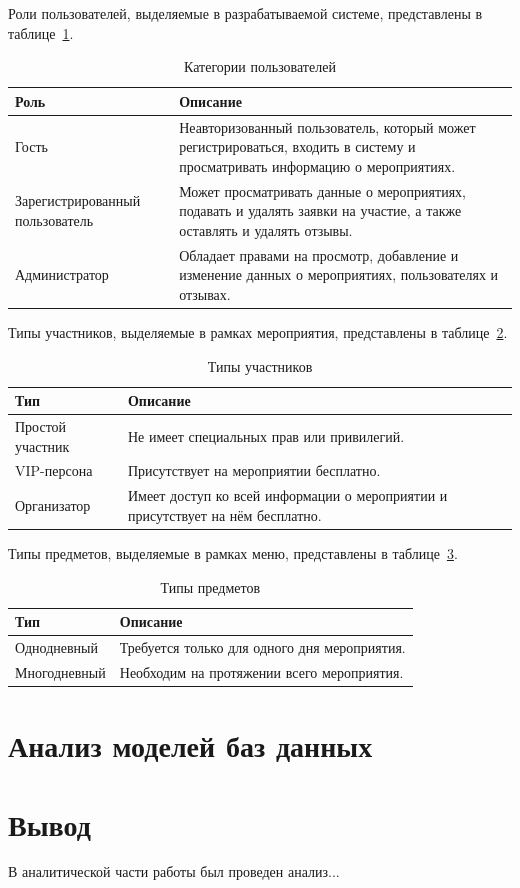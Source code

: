 Роли пользователей, выделяемые в разрабатываемой системе, представлены в таблице~\ref{tbl:user-roles}.

\begin{table}[h]
	\centering
	\caption{Категории пользователей}
	\begin{tabularx}{\textwidth}{|p{5cm}|X|}
		\hline
		\textbf{Роль} & \textbf{Описание} \\
		\hline
		Гость & Неавторизованный пользователь, который может регистрироваться, входить в систему и просматривать информацию о мероприятиях. \\
		\hline
		Зарегистрированный пользователь & Может просматривать данные о мероприятиях, подавать и удалять заявки на участие, а также оставлять и удалять отзывы. \\
		\hline
		Администратор & Обладает правами на просмотр, добавление и изменение данных о мероприятиях, пользователях и отзывах. \\
		\hline
	\end{tabularx}
	\label{tbl:user-roles}
\end{table}

Типы участников, выделяемые в рамках мероприятия, представлены в таблице~\ref{tbl:person-types}.

\begin{table}[h]
	\centering
	\caption{Типы участников}
	\begin{tabularx}{\textwidth}{|p{5cm}|X|}
		\hline
		\textbf{Тип} & \textbf{Описание} \\
		\hline
		Простой участник & Не имеет специальных прав или привилегий. \\
		\hline
		VIP-персона & Присутствует на мероприятии бесплатно. \\
		\hline
		Организатор & Имеет доступ ко всей информации о мероприятии и присутствует на нём бесплатно. \\
		\hline
	\end{tabularx}
	\label{tbl:person-types}
\end{table}

\newpage

Типы предметов, выделяемые в рамках меню, представлены в таблице~\ref{tbl:items-types}.

\begin{table}[h]
	\centering
	\caption{Типы предметов}
	\begin{tabularx}{\textwidth}{|p{5cm}|X|}
		\hline
		\textbf{Тип} & \textbf{Описание} \\
		\hline
		Однодневный & Требуется только для одного дня мероприятия. \\
		\hline
		Многодневный & Необходим на протяжении всего мероприятия. \\
		\hline
	\end{tabularx}
	\label{tbl:items-types}
\end{table}

\section{Анализ моделей баз данных}

\section{Вывод}

В аналитической части работы был проведен анализ...

\clearpage
